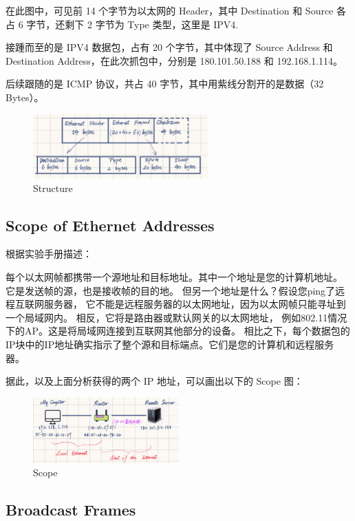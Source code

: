\documentclass[14pt,a4paper,UTF8,twoside]{article}
\begin{document}
在此图中，可见前 14 个字节为以太网的 Header，其中 Destination 和 Source 各占 6 字节，还剩下 2 字节为 Type 类型，这里是 IPV4.

接踵而至的是 IPV4 数据包，占有 20 个字节，其中体现了 Source Address 和 Destination Address，在此次抓包中，分别是 180.101.50.188 和 192.168.1.114。

后续跟随的是 ICMP 协议，共占 40 字节，其中用紫线分割开的是数据（32 Bytes）。

\begin{figure}[H]
  \centering
  \includegraphics[width=0.6\textwidth]{lab2/draw.png}
  \caption{Structure}
\end{figure}

\subsection{Scope of Ethernet Addresses}

根据实验手册描述：

每个以太网帧都携带一个源地址和目标地址。其中一个地址是您的计算机地址。
它是发送帧的源，也是接收帧的目的地。
但另一个地址是什么？假设您ping了远程互联网服务器，
它不能是远程服务器的以太网地址，因为以太网帧只能寻址到一个局域网内。
相反，它将是路由器或默认网关的以太网地址，
例如802.11情况下的AP。这是将局域网连接到互联网其他部分的设备。
相比之下，每个数据包的IP块中的IP地址确实指示了整个源和目标端点。它们是您的计算机和远程服务器。

据此，以及上面分析获得的两个 IP 地址，可以画出以下的 Scope 图：

\begin{figure}[H]
  \centering
  \includegraphics[width=0.5\textwidth]{lab2/scope.png}
  \caption{Scope}
\end{figure}

\subsection{Broadcast Frames}
\end{document}
